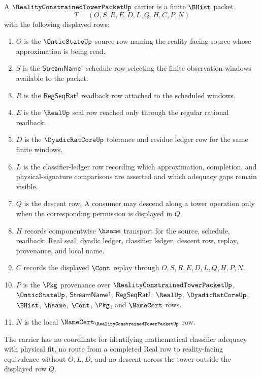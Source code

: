 \begin{definition}
\label{def:reality-constrained-tower-packet-carrier}
A $\RealityConstrainedTowerPacketUp$ carrier is a finite $\BHist$ packet
$$
T=(O,S,R,E,D,L,Q,H,C,P,N)
$$
with the following displayed rows:
\begin{enumerate}
\item $O$ is the $\OnticStateUp$ source row naming the reality-facing source whose approximation is being read.
\item $S$ is the $\mathsf{StreamName}^{\uparrow}$ schedule row selecting the finite observation windows available to the packet.
\item $R$ is the $\mathsf{RegSeqRat}^{\uparrow}$ readback row attached to the scheduled windows.
\item $E$ is the $\RealUp$ seal row reached only through the regular rational readback.
\item $D$ is the $\DyadicRatCoreUp$ tolerance and residue ledger row for the same finite windows.
\item $L$ is the classifier-ledger row recording which approximation, completion, and physical-signature comparisons are asserted and which adequacy gaps remain visible.
\item $Q$ is the descent row. A consumer may descend along a tower operation only when the corresponding permission is displayed in $Q$.
\item $H$ records componentwise $\hsame$ transport for the source, schedule, readback, Real seal, dyadic ledger, classifier ledger, descent row, replay, provenance, and local name.
\item $C$ records the displayed $\Cont$ replay through $O,S,R,E,D,L,Q,H,P,N$.
\item $P$ is the $\Pkg$ provenance over $\RealityConstrainedTowerPacketUp$, $\OnticStateUp$, $\mathsf{StreamName}^{\uparrow}$, $\mathsf{RegSeqRat}^{\uparrow}$, $\RealUp$, $\DyadicRatCoreUp$, $\BHist$, $\hsame$, $\Cont$, $\Pkg$, and $\NameCert$ rows.
\item $N$ is the local $\NameCert_{\RealityConstrainedTowerPacketUp}$ row.
\end{enumerate}
The carrier has no coordinate for identifying mathematical classifier adequacy with physical fit, no route from a completed Real row to reality-facing equivalence without $O,L,D$, and no descent across the tower outside the displayed row $Q$.
\end{definition}

